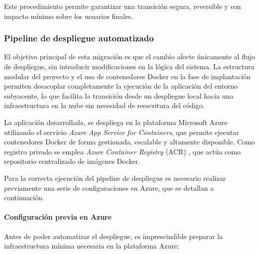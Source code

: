 Este procedimiento permite garantizar una transición segura, reversible y con impacto mínimo sobre los usuarios finales.

\subsubsection{Pipeline de despliegue automatizado}
\label{sec:pipeline_azure}

El objetivo principal de esta migración es que el cambio afecte únicamente al flujo de despliegue, sin introducir modificaciones en la lógica del sistema. La estructura modular del proyecto y el uso de contenedores Docker en la fase de implantación \cite{docker_docs} permiten desacoplar completamente la ejecución de la aplicación del entorno subyacente, lo que facilita la transición desde un despliegue local hacia una infraestructura en la nube sin necesidad de reescritura del código.

La aplicación desarrollada, se despliega en la plataforma Microsoft Azure utilizando el servicio \textit{Azure App Service for Containers}, que permite ejecutar contenedores Docker de forma gestionada, escalable y altamente disponible. Como registro privado se emplea \textit{Azure Container Registry} (ACR) \cite{azure_container_registry_docs}, que actúa como repositorio centralizado de imágenes Docker.

Para la correcta ejecución del pipeline de despliegue es necesario realizar previamente una serie de configuraciones en Azure, que se detallan a continuación.

\paragraph{Configuración previa en Azure}

Antes de poder automatizar el despliegue, es imprescindible preparar la infraestructura mínima necesaria en la plataforma Azure:

